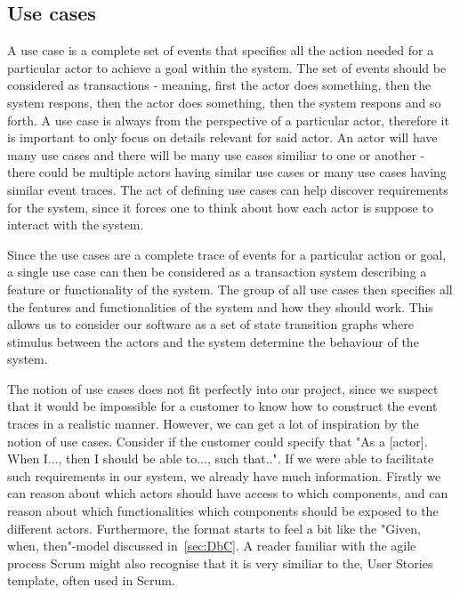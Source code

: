 \subsection{Use cases}
A use case is a complete set of events that specifies all the action needed for a particular actor to achieve a goal within the system. 
The set of events should be considered as transactions - meaning, first the actor does something, then the system respons, then the actor does something, then the system respons and so forth. 
A use case is always from the perspective of a particular actor, therefore it is important to only focus on details relevant for said actor. 
An actor will have many use cases and there will be many use cases similiar to one or another - there could be multiple actors having similar use cases or many use cases having similar event traces. 
The act of defining use cases can help discover requirements for the system, since it forces one to think about how each actor is suppose to interact with the system.

Since the use cases are a complete trace of events for a particular action or goal, a single use case can then be considered as a transaction system describing a feature or functionality of the system. 
The group of all use cases then specifies all the features and functionalities of the system and how they should work. 
This allows us to consider our software as a set of state transition graphs where stimulus between the actors and the system determine the behaviour of the system.

The notion of use cases does not fit perfectly into our project, since we suspect that it would be impossible for a customer to know how to construct the event traces in a realistic manner. 
However, we can get a lot of inspiration by the notion of use cases. 
Consider if the customer could specify that "As a [actor]. When I..., then I should be able to..., such that..".
If we were able to facilitate such requirements in our system, we already have much information.
Firstly we can reason about which actors should have access to which components, and can reason about which functionalities which components should be exposed to the different actors.
Furthermore, the format starts to feel a bit like the "Given, when, then"-model discussed in~\autoref{sec:DbC}.
A reader familiar with the agile process Scrum might also recognise that it is very similiar to the, User Stories template, often used in Scrum.
